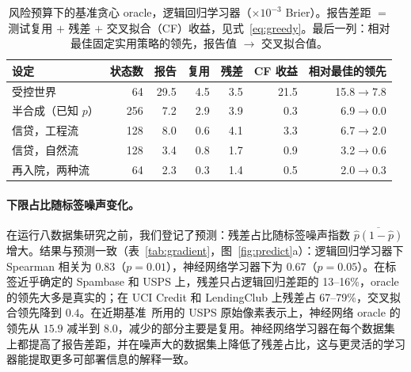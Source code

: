 \documentclass[runningheads]{llncs}
\begin{document}
\begin{table}[t]
\caption{风险预算下的基准贪心 oracle，逻辑回归学习器（$\times10^{-3}$ Brier）。报告差距 $=$ 测试复用 $+$ 残差 $+$ 交叉拟合（CF）收益，见式~\eqref{eq:greedy}。最后一列：相对最佳固定实用策略的领先，报告值 $\to$ 交叉拟合值。}
\label{tab:known}
\centering\scriptsize
\setlength{\tabcolsep}{3.5pt}
\begin{tabular}{lrrrrrr}
\toprule
设定 & 状态数 & 报告 & 复用 & 残差 & CF 收益 & 相对最佳的领先 \\
\midrule
受控世界 & 64 & 29.5 & 4.5 & 3.5 & 21.5 & 15.8$\to$7.8 \\
半合成（已知 $p$） & 256 & 7.2 & 2.9 & 3.9 & 0.3 & 6.9$\to$0.0 \\
信贷，工程流 & 128 & 8.0 & 0.6 & 4.1 & 3.3 & 6.7$\to$2.0 \\
信贷，自然流 & 128 & 3.4 & 0.8 & 1.7 & 0.9 & 3.2$\to$0.6 \\
再入院，两种流 & 64 & 2.3 & 0.3 & 1.4 & 0.5 & 2.0$\to$0.3 \\
\bottomrule
\end{tabular}
\end{table}

\paragraph{下限占比随标签噪声变化。}在运行八数据集研究之前，我们登记了预测：残差占比随标签噪声指数 $\overline{\hat p(1-\hat p)}$ 增大。结果与预测一致（表~\ref{tab:gradient}，图~\ref{fig:predict}a）：逻辑回归学习器下 Spearman 相关为 $0.83$（$p=0.01$），神经网络学习器下为 $0.67$（$p=0.05$）。在标签近乎确定的 Spambase 和 USPS 上，残差只占逻辑回归差距的 13--16\%，oracle 的领先大多是真实的；在 UCI Credit 和 LendingClub 上残差占 67--79\%，交叉拟合领先降到 $0.4$。在近期基准~\cite{werner2024cdalbench}所用的 USPS 原始像素表示上，神经网络 oracle 的领先从 $15.9$ 减半到 $8.0$，减少的部分主要是复用。神经网络学习器在每个数据集上都提高了报告差距，并在噪声大的数据集上降低了残差占比，这与更灵活的学习器能提取更多可部署信息的解释一致。
\end{document}
